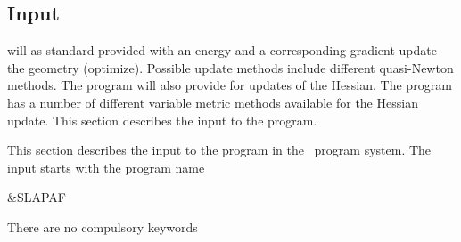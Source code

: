 \subsection{Input}
\label{UG:sec:SlapAf_input}
 will as standard
provided with an energy and a corresponding gradient
update the geometry (optimize).
Possible update methods include different quasi-Newton methods.
The program will also provide for updates of the Hessian.
The program has a number of different variable metric methods available for
the Hessian update.
This section describes the input to the  program.

This section describes the input to the
 program in the \molcas\ program system. The input starts
with the program name
\begin{inputlisting}
 &SLAPAF
\end{inputlisting}

There are no compulsory keywords

